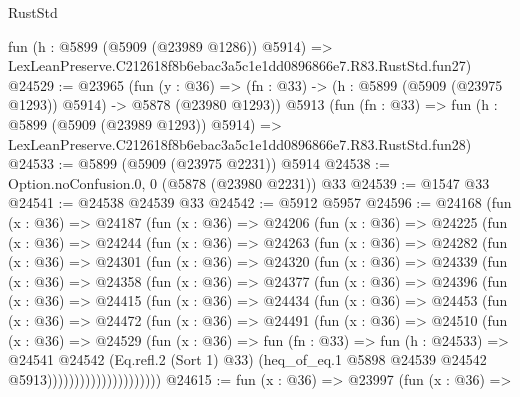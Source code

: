 \begin{lexlean}{RustStd}
\begin{coremodule}
{{    fun (h : @5899 (@5909 (@23989 @1286)) @5914) =>
    LexLeanPreserve.C212618f8b6ebac3a5c1e1dd0896866e7.R83.RustStd.fun27)
@24529 := @23965
    (fun (y : @36) =>
    (fn : @33) -> (h : @5899 (@5909 (@23975 @1293)) @5914) -> @5878 (@23980 @1293))
    @5913
    (fun (fn : @33) =>
    fun (h : @5899 (@5909 (@23989 @1293)) @5914) =>
    LexLeanPreserve.C212618f8b6ebac3a5c1e1dd0896866e7.R83.RustStd.fun28)
@24533 := @5899 (@5909 (@23975 @2231)) @5914
@24538 := Option.noConfusion.{0, 0} (@5878 (@23980 @2231)) @33
@24539 := @1547 @33
@24541 := @24538 @24539 @33
@24542 := @5912 @5957
@24596 := @24168
    (fun (x : @36) =>
    @24187
      (fun (x : @36) =>
      @24206
        (fun (x : @36) =>
        @24225
          (fun (x : @36) =>
          @24244
            (fun (x : @36) =>
            @24263
              (fun (x : @36) =>
              @24282
                (fun (x : @36) =>
                @24301
                  (fun (x : @36) =>
                  @24320
                    (fun (x : @36) =>
                    @24339
                      (fun (x : @36) =>
                      @24358
                        (fun (x : @36) =>
                        @24377
                          (fun (x : @36) =>
                          @24396
                            (fun (x : @36) =>
                            @24415
                              (fun (x : @36) =>
                              @24434
                                (fun (x : @36) =>
                                @24453
                                  (fun (x : @36) =>
                                  @24472
                                    (fun (x : @36) =>
                                    @24491
                                      (fun (x : @36) =>
                                      @24510
                                        (fun (x : @36) =>
                                        @24529
                                          (fun (x : @36) =>
                                          fun (fn : @33) =>
                                          fun (h : @24533) =>
                                          @24541
                                            @24542
                                            (Eq.refl.{2} (Sort 1) @33)
                                            (heq_of_eq.{1}
                                              @5898
                                              @24539
                                              @24542
                                              @5913)))))))))))))))))))))
@24615 := fun (x : @36) =>
  @23997
    (fun (x : @36) =>
}}
\end{coremodule}
\end{lexlean}
